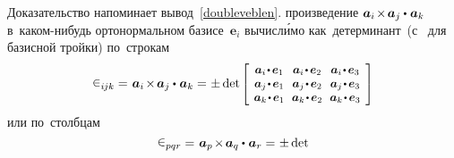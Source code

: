 \begin{otherlanguage}{russian}
Доказательство напоминает вывод~\eqref{doubleveblen}.  произведение ${\bm{a}_i \hspace{-0.25ex} \times \hspace{-0.25ex} \bm{a}_j \dotp \hspace{0.1ex} \bm{a}_k}$ в~каком\hbox{-}нибудь орто\-нормаль\-ном базисе~${\bm{e}_i}$ вычисл\'{и}мо как~детерминант~(с~\inquotes{$-$} для~ базисной тройки) по~строкам
\vspace{-0.4em}\[
\levicivita_{i\hspace{-0.1ex}jk} =\hspace{0.16ex} \bm{a}_i \hspace{-0.25ex} \times \hspace{-0.25ex} \bm{a}_j \dotp \hspace{0.1ex} \bm{a}_k =
\hspace{0.1ex} \pm \operatorname{det}\hspace{-0.1ex}
\scalebox{0.92}[0.92]{$\left[\hspace{-0.2ex}\begin{array}{c@{\hspace{0.64em}}c@{\hspace{0.64em}}c}
\bm{a}_i \narrowdotp\hspace{0.12ex} \bm{e}_1 & \bm{a}_i \narrowdotp\hspace{0.12ex} \bm{e}_2 & \bm{a}_i \narrowdotp\hspace{0.12ex} \bm{e}_3 \\
\bm{a}_j \narrowdotp\hspace{0.12ex} \bm{e}_1 & \bm{a}_j \narrowdotp\hspace{0.12ex} \bm{e}_2 & \bm{a}_j \narrowdotp\hspace{0.12ex} \bm{e}_3 \\
\bm{a}_k \narrowdotp\hspace{0.12ex} \bm{e}_1 & \bm{a}_k \narrowdotp\hspace{0.12ex} \bm{e}_2 & \bm{a}_k \narrowdotp\hspace{0.12ex} \bm{e}_3
\end{array}\hspace{-0.12ex}\right]$}
\]
или по~столбцам
\vspace{-0.4em}\[
\levicivita_{pqr} =\hspace{0.16ex} \bm{a}_p \hspace{-0.25ex} \times \hspace{-0.25ex} \bm{a}_q \dotp \hspace{0.1ex} \bm{a}_r =
\hspace{0.1ex} \pm \operatorname{det}\hspace{-0.1ex}
\]
\end{otherlanguage}
